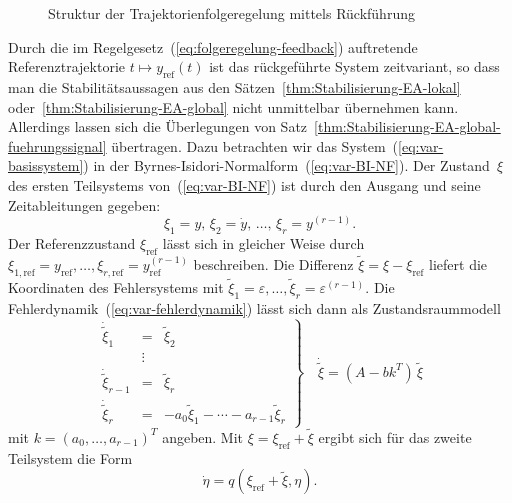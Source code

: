 \begin{figure}
\begin{centering}
\resizebox{0.95\textwidth}{!}{}
\par\end{centering}
\caption{Struktur der Trajektorienfolgeregelung mittels Rückführung\label{fig:Trajektorienfolgeregelung-FB}}

\end{figure}

\medskip{}

Durch die im Regelgesetz~(\ref{eq:folgeregelung-feedback}) auftretende
Referenztrajektorie $t\mapsto y_{\text{ref}}(t)$ ist das rückgeführte
System zeitvariant, so dass man die Stabilitätsaussagen aus den Sätzen~\ref{thm:Stabilisierung-EA-lokal}
oder~\ref{thm:Stabilisierung-EA-global} nicht unmittelbar übernehmen
kann. Allerdings lassen sich die Überlegungen von Satz~\ref{thm:Stabilisierung-EA-global-fuehrungssignal}
übertragen. Dazu betrachten wir das System~(\ref{eq:var-basissystem})
in der Byrnes-Isidori-Normalform~(\ref{eq:var-BI-NF}). Der Zustand~$\xi$
des ersten Teilsystems von~(\ref{eq:var-BI-NF}) ist durch den Ausgang
und seine Zeitableitungen gegeben:
\begin{equation}
\xi_{1}=y,\,\xi_{2}=\dot{y},\,\ldots,\,\xi_{r}=y^{(r-1)}.\label{eq:Zustand-xi-durch-y}
\end{equation}
Der Referenzzustand $\xi_{\text{ref}}$ lässt sich in gleicher Weise
durch $\xi_{1,\text{ref}}=y_{\text{ref}},\ldots,\xi_{r,\text{ref}}=y_{\text{ref}}^{(r-1)}$
beschreiben. Die Differenz $\tilde{\xi}=\xi-\xi_{\text{ref}}$ liefert
die Koordinaten des Fehlersystems mit $\tilde{\xi}_{1}=\varepsilon,\ldots,\tilde{\xi}_{r}=\varepsilon^{(r-1)}$.
Die Fehlerdynamik~(\ref{eq:var-fehlerdynamik}) lässt sich dann als
Zustandsraummodell
\begin{equation}
\left.\begin{array}{lcl}
\dot{\tilde{\xi}}_{1} & = & \tilde{\xi}_{2}\\
 & \vdots\\
\dot{\tilde{\xi}}_{r-1} & = & \tilde{\xi}_{r}\\
\dot{\tilde{\xi}}_{r} & = & -a_{0}\tilde{\xi}_{1}-\cdots-a_{r-1}\tilde{\xi}_{r}
\end{array}\right\} \quad\dot{\tilde{\xi}}=(A-bk^{T})\,\tilde{\xi}\label{eq:folgesystem-FB1}
\end{equation}
mit $k=(a_{0},\ldots,a_{r-1})^{T}$ angeben. Mit $\xi=\xi_{\text{ref}}+\tilde{\xi}$
ergibt sich für das zweite Teilsystem die Form
\begin{equation}
\dot{\eta}=q(\xi_{\text{ref}}+\tilde{\xi},\eta).\label{eq:folgesystem-FB2}
\end{equation}

